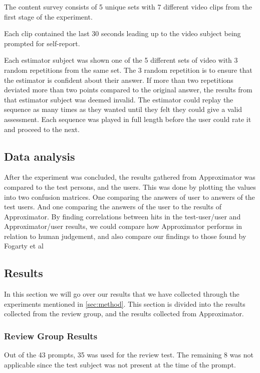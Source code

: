 \documentclass{sigchi}
\begin{document}
The content survey consists of 5 unique sets with 7 different video clips from the first stage of the experiment.

Each clip contained the last 30 seconds leading up to the video subject being prompted for self-report.

Each estimator subject was shown one of the 5 different sets of video with 3 random repetitions from the same set.
The 3 random repetition is to ensure that the estimator is confident about their answer.
If more than two repetitions deviated more than two points compared to the original answer, the results from that estimator subject was deemed invalid.
The estimator could replay the sequence as many times as they wanted until they felt they could give a valid assessment.
Each sequence was played in full length before the user could rate it and proceed to the next.

\subsection{Data analysis}
After the experiment was concluded, the results gathered from Approximator was compared to the test persons, and the users.
This was done by plotting the values into two confusion matrices.
One comparing the answers of user to answers of the test users.
And one comparing the answers of the user to the results of Approximator.
By finding correlations between hits in the test-user/user and Approximator/user results, we could compare how Approximator performs in relation to human judgement, and also compare our findings to those found by Fogarty et al \cite{fogarty2005predicting}

\subsection{Results}
In this section we will go over our results that we have collected through the experiments mentioned in \autoref{sec:method}.
This section is divided into the results collected from the review group, and the results collected from Approximator.

\subsubsection{Review Group Results}
Out of the 43 prompts, 35 was used for the review test.
The remaining 8 was not applicable since the test subject was not present at the time of the prompt.
\end{document}
